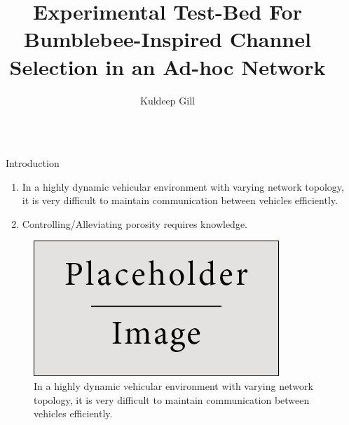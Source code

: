 \documentclass[final]{beamer}
\title{Experimental Test-Bed For Bumblebee-Inspired Channel Selection in an Ad-hoc Network} %
\author{Kuldeep Gill} %
\institute{Worcester Polytechnic Institute} %
\newlength{\sepwid}
\newlength{\onecolwid}
\begin{document}
\setlength{\belowcaptionskip}{1ex} %
\setlength\belowdisplayshortskip{1ex} %



\begin{frame}[t] %
\begin{columns}[t] %
\begin{column}{\sepwid}\end{column} %
\begin{column}{\onecolwid} %

\begin{alertblock}{Introduction}
\begin{enumerate}
\item In a highly dynamic vehicular environment with varying network topology, it is very difficult to maintain communication between vehicles efficiently.
\item Controlling/Alleviating porosity requires knowledge. 
\end{enumerate}
\begin{figure}
\includegraphics[width=\textwidth,keepaspectratio]{placeholder.jpg}
\caption{In a highly dynamic vehicular environment with varying network topology, it is very difficult to maintain communication between vehicles efficiently.}
 \end{figure}
\end{alertblock}


\end{column}
\end{columns}
\end{frame}
\end{document}
